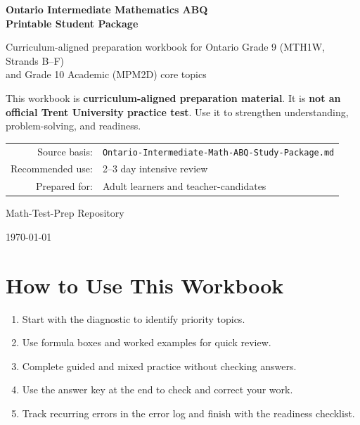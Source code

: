 \documentclass[12pt,oneside]{article}
\begin{document}
\begin{titlepage}
\centering
{\Huge\bfseries Ontario Intermediate Mathematics ABQ\\Printable Student Package\par}
\vspace{1cm}
{\Large Curriculum-aligned preparation workbook for Ontario Grade 9 (MTH1W, Strands B--F)\\and Grade 10 Academic (MPM2D) core topics\par}
\vspace{1.5cm}
\begin{tcolorbox}[width=0.92\textwidth,colback=white,colframe=black,title=Important Note,fonttitle=\bfseries]
This workbook is \textbf{curriculum-aligned preparation material}. It is \textbf{not an official Trent University practice test}. Use it to strengthen understanding, problem-solving, and readiness.
\end{tcolorbox}
\vfill
\begin{tabular}{rl}
Source basis: & \texttt{Ontario-Intermediate-Math-ABQ-Study-Package.md} \\
Recommended use: & 2--3 day intensive review \\
Prepared for: & Adult learners and teacher-candidates
\end{tabular}
\vfill
{\large Math-Test-Prep Repository\par}
{\large \today\par}
\end{titlepage}

\tableofcontents
\newpage

\section*{How to Use This Workbook}
\begin{enumerate}
  \item Start with the diagnostic to identify priority topics.
  \item Use formula boxes and worked examples for quick review.
  \item Complete guided and mixed practice without checking answers.
  \item Use the answer key at the end to check and correct your work.
  \item Track recurring errors in the error log and finish with the readiness checklist.
\end{enumerate}
\end{document}
